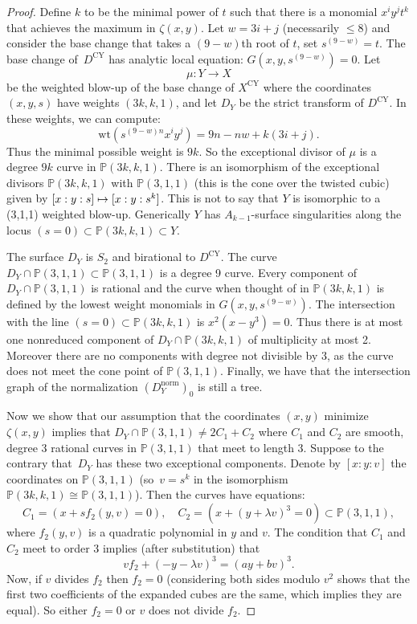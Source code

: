 \documentclass[JEP,XML,SOM,Unicode,NoFloatCountersInSection,published]{cedram}
\newcommand\mto{\mathchoice{\longmapsto}{\mapsto}{\mapsto}{\mapsto}}
\theoremstyle{plain}
\theoremstyle{definition}
\newcommand\PP{{\mathbb{P}}}
\newcommand\norm{{\mathrm{norm}}}
\newcommand\wt{{\mathrm{wt}}}
\newcommand\Dcy{{D^{\mathrm{CY}}}}
\newcommand\Xcy{{X^{\mathrm{CY}}}}
\newcommand\cl{{\colon}}
\begin{document}
\begin{proof}
Define $k$ to be the minimal power of $t$ such that there is a monomial $x^iy^jt^k$ that achieves the maximum in $\zeta(x,y)$. Let $w = 3i+j$ (necessarily $\le 8$) and consider the base change that takes a $(9-w)$th root of $t$, \ie set $s^{(9-w)} = t$. The base change of~$\Dcy$ has analytic local equation: $G(x,y,s^{(9-w)})=0$.
Let
\[
\mu\cl Y\to X
\]
be the weighted blow-up of the base change of $\Xcy$ where the coordinates $(x,y,s)$ have weights $(3k,k,1)$, and let $D_Y$ be the strict transform of $\Dcy$. In these weights, we can compute:
\[
\wt(s^{(9-w)n}x^iy^j) = 9n - nw +k(3i+j).
\]
Thus the minimal possible weight is $9k$. So the exceptional divisor of $\mu$ is a degree $9k$ curve in $\PP(3k,k,1)$. There is an isomorphism of the exceptional divisors $\PP(3k,k,1)$ with $\PP(3,1,1)$ (this is the cone over the twisted cubic) given by $[x:y:s]\mto [x:y:s^k]$. This is not to say that $Y$ is isomorphic to a (3,1,1) weighted blow-up. Generically $Y$ has $A_{k-1}$-surface singularities along the locus $(s=0)\subset \PP(3k,k,1)\subset Y$.

The surface $D_Y$ is $S_2$ and birational to $\Dcy$. The curve $D_Y\cap \PP(3,1,1)\subset \PP(3,1,1)$ is a degree 9 curve. Every component of $D_Y\cap \PP(3,1,1)$ is rational and the curve when thought of in $\PP(3k,k,1)$ is defined by the lowest weight monomials in $G(x,y,s^{(9-w)})$. The intersection with the line $(s=0)\subset \PP(3k,k,1)$ is $x^2(x-y^3)=0$. Thus there is at most one nonreduced component of $D_Y\cap \PP(3k,k,1)$ of multiplicity at most 2. Moreover there are no components with degree not divisible by 3, as the curve does not meet the cone point of $\PP(3,1,1)$. Finally, we have that the intersection graph of the normalization $(D_Y^\norm)_0$ is still a tree.

Now we show that our assumption that the coordinates $(x,y)$ minimize $\zeta(x,y)$ implies that $D_Y\cap \PP(3,1,1)\ne 2C_1+C_2$ where $C_1$ and $C_2$ are smooth, degree 3 rational curves in $\PP(3,1,1)$ that meet to length 3. Suppose to the contrary that~$D_Y$ has these two exceptional components. Denote by $[x:y:v]$ the coordinates on $\PP(3,1,1)$ (so~$v = s^k$ in the isomorphism $\PP(3k,k,1) \cong \PP(3,1,1)$). Then the curves have equations:
\[
C_1 = \left(x+s f_2(y,v)=0\right),\quad C_2 = \left(x+(y+\lambda v)^3 = 0\right)\subset \PP(3,1,1),
\]
where $f_2(y,v)$ is a quadratic polynomial in $y$ and $v$. The condition that $C_1$ and $C_2$ meet to order 3 implies (after substitution) that
\begin{equation}
v f_2 + (-y-\lambda v)^3 = (ay+bv)^3.
\end{equation}
Now, if $v$ divides $f_2$ then $f_2=0$ (considering both sides modulo $v^2$ shows that the first two coefficients of the expanded cubes are the same, which implies they are equal). So either $f_2=0$ or $v$ does not divide $f_2$.


\end{proof}
\end{document}
